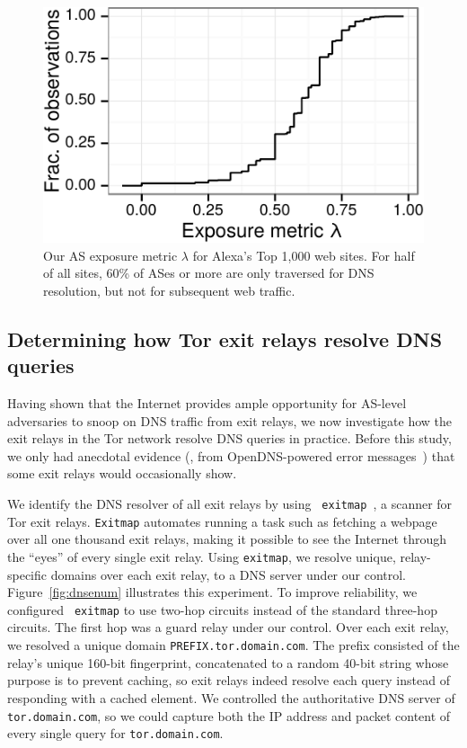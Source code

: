 \begin{figure}[t]
	\centering
	\includegraphics[width=0.65\linewidth]{figures/dns-exposure.pdf}
	\caption{Our AS exposure metric $\lambda$ for Alexa's Top 1,000 web sites.
	For half of all sites, 60\% of ASes or more are only traversed for DNS
	resolution, but not for subsequent web traffic.}
	\label{fig:exposure}
\end{figure}

\subsection{Determining how Tor exit relays resolve DNS queries}
\label{sec:mapping-resolvers}

Having shown that the Internet provides ample opportunity for
AS-level adversaries to snoop on DNS traffic from exit relays, we
now investigate how the exit relays in the Tor network resolve DNS
queries in practice. Before this study,
we only had anecdotal evidence (\eg, from OpenDNS-powered error
messages~\cite[\S~4.1]{Winter2014b}) that some exit relays would occasionally
show.

We identify the DNS resolver of all exit relays by using {\tt
exitmap}~\cite{exitmap}, a scanner for Tor exit relays.  {\tt Exitmap} automates
running a task such as fetching a webpage over all one thousand exit relays,
making it possible to see the Internet through the ``eyes'' of every single exit
relay.  Using {\tt exitmap}, we resolve unique, relay-specific domains over each
exit relay, to a DNS server under our control.  Figure~\ref{fig:dnsenum}
illustrates this experiment.  To improve reliability, we configured {\tt
exitmap} to use two-hop circuits instead of the standard three-hop circuits.
The first hop was a guard relay under our control.  Over each exit relay, we
resolved a unique domain {\tt PREFIX.tor.domain.com}.  The prefix consisted of
the relay's unique 160-bit fingerprint, concatenated to a random 40-bit string
whose purpose is to prevent caching, so exit relays indeed resolve each query
instead of responding with a cached element.  We controlled the authoritative
DNS server of {\tt tor.domain.com}, so we could capture both the IP address and
packet content of every single query for {\tt tor.domain.com}.

